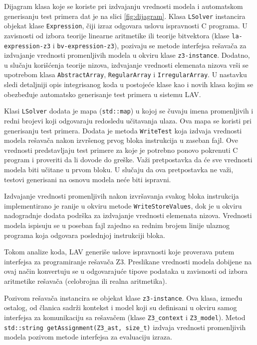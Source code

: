 \documentclass[12pt,oneside]{memoir}
\begin{document}
Dijagram klasa koje se koriste pri izdvajanju vrednosti modela i automatskom generisanju test primera dat je na slici \ref{fig:dijagram}. Klasa \texttt{LSolver} instancira objekat klase \texttt{Expression}, čiji izraz odgovara uslovu ispravnosti C programa. U zavisnosti od izbora teorije linearne aritmetike ili teorije bitvektora (klase \texttt{la-expression-z3} i \texttt{bv-expression-z3}), pozivaju se metode interfejsa rešavača za izdvajanje vrednosti promenljivih modela u okviru klase \texttt{z3-instance}. Dodatno, u slučaju korišćenja teorije nizova, izdvajanje vrednosti elemenata nizova vrši se upotrebom klasa \texttt{AbstractArray}, \texttt{RegularArray} i \texttt{IrregularArray}. U nastavku sledi detaljniji opis integrisanog koda u postojeće klase kao i novih klasa kojim se obezbeđuje automatsko generisanje test primera u sistemu LAV.
\par
Klasi \texttt{LSolver} dodata je mapa (\texttt{std::map}) u kojoj se čuvaju imena promenljivih i redni brojevi koji odgovaraju redosledu učitavanja ulaza. Ova mapa se koristi pri generisanju test primera. Dodata je metoda 
\texttt{WriteTest} koja izdvaja vrednosti modela rešavača nakon izvršenog prvog bloka instrukcija u zaseban fajl. Ove vrednosti predstavljaju test primere za koje je potrebno ponovo pokrenuti C program i proveriti da li dovode do greške. Važi pretpostavka da će sve vrednosti modela biti učitane u prvom bloku. U slučaju da ova pretpostavka ne važi, testovi generisani na osnovu modela neće biti ispravni.
\par
Izdvajanje vrednosti promenljivih nakon izvršavanja svakog bloka instrukcija implementirano je ranije u okviru metode \texttt{WriteStoreValues}, dok je u okviru nadogradnje dodata podrška za izdvajanje vrednosti elemenata nizova. Vrednosti modela ispisuju se u poseban fajl zajedno sa rednim brojem linije ulaznog programa koja odgovara poslednjoj instrukciji bloka.
\par
Tokom analize koda, LAV generiše uslove ispravnosti koje proverava putem interfejsa za programiranje rešavača Z3. Preslikane vrednosti modela dobijene na ovaj način konvertuju se u odgovarajuće tipove podataka u zavisnosti od izbora aritmetike rešavača (celobrojna ili realna aritmetika).

\par
Pozivom rešavača instancira se objekat klase \texttt{z3-instance}. Ova klasa, između ostalog, od članica sadrži kontekst i model koji su definisani u okviru samog interfejsa za komunikaciju sa rešavačem (klase \texttt{Z3\_context} i \texttt{Z3\_model}). Metod \texttt{std::string getAssignment(Z3\_ast, size\_t)} izdvaja vrednosti promenljivih modela pozivom metode interfejsa za evaluaciju izraza. 
\end{document}
